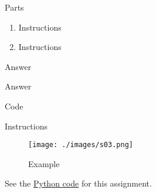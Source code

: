 


%
%

\newcommand{\hmwkTitle}{HW00}
\newcommand{\hmwkSubTitle}{Homework Template}
\newcommand{\hmwkDueDate}{September 25th. 2025}
\newcommand{\hmwkDueTime}{09:30 AM}
\newcommand{\hmwkClass}{ENAE 441 - 0101}
\newcommand{\hmwkClassTime}{09:30 AM}
\newcommand{\hmwkClassInstructor}{Dr. Martin}
\newcommand{\hmwkAuthorName}{\textbf{Vai Srivastava}}
\newcommand{\hmwkCompletionDate}{\today}



\maketitle

\pagebreak

\begin{hwkProblem}{1}{Parts}\label{hwk:p01}

	\begin{enumerate}
		\item \label{hwk:p01.01} Instructions
		\item \label{hwk:p01.02} Instructions
	\end{enumerate}

	\hwkSol{} \label{hwk:s01}

	\hwkPart{} \label{hwk:s01.01}

	Answer

	\hwkPart{} \label{hwk:s01.02}

	Answer

\end{hwkProblem}

\begin{hwkProblem}{2}{Code}\label{hwk:p02}

	Instructions

	\hwkSol{} \label{hwk:s02}

	\begin{figure}[H] \label{fig:s03}
		\begin{center}
			\texttt{[image: ./images/s03.png]}
		\end{center}
		\caption{Example}
	\end{figure}

	\hwkCode{} \label{code:s02}

	See the \href{https://www.github.com/vaisriv/enae441-hw-template/blob/main/code/submission.py}{Python code} for this assignment.

\end{hwkProblem}


